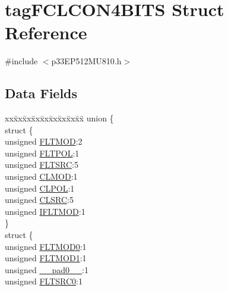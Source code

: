 \hypertarget{structtag_f_c_l_c_o_n4_b_i_t_s}{}\section{tag\+F\+C\+L\+C\+O\+N4\+B\+I\+TS Struct Reference}
\label{structtag_f_c_l_c_o_n4_b_i_t_s}


{\ttfamily \#include $<$p33\+E\+P512\+M\+U810.\+h$>$}

\subsection*{Data Fields}
\begin{DoxyCompactItemize}
\item 
\begin{tabbing}
xx\=xx\=xx\=xx\=xx\=xx\=xx\=xx\=xx\=\kill
union \{\\
\>struct \{\\
\>\>unsigned \hyperlink{structtag_f_c_l_c_o_n4_b_i_t_s_af8b7a5d667b31f1b0185c35ff963fc67}{FLTMOD}:2\\
\>\>unsigned \hyperlink{structtag_f_c_l_c_o_n4_b_i_t_s_acc9b95c2c3d735179abf0bb2304d00aa}{FLTPOL}:1\\
\>\>unsigned \hyperlink{structtag_f_c_l_c_o_n4_b_i_t_s_a5a279b9076b9774eeddf447ae606182a}{FLTSRC}:5\\
\>\>unsigned \hyperlink{structtag_f_c_l_c_o_n4_b_i_t_s_a9e490f0d4e5c9492ed27b0835fd4baa1}{CLMOD}:1\\
\>\>unsigned \hyperlink{structtag_f_c_l_c_o_n4_b_i_t_s_aa4163df728ce542fa3662a31fed0dab0}{CLPOL}:1\\
\>\>unsigned \hyperlink{structtag_f_c_l_c_o_n4_b_i_t_s_a55ab508cbc7a5023f1962f743a92a56b}{CLSRC}:5\\
\>\>unsigned \hyperlink{structtag_f_c_l_c_o_n4_b_i_t_s_a4573eed251d96a98a6b5ba1c7cc30451}{IFLTMOD}:1\\
\>\} \\
\>struct \{\\
\>\>unsigned \hyperlink{structtag_f_c_l_c_o_n4_b_i_t_s_acd6a08a1920b6cc12c170cbd6a61247d}{FLTMOD0}:1\\
\>\>unsigned \hyperlink{structtag_f_c_l_c_o_n4_b_i_t_s_accd970bed6a20d6ed7d5a8bb0a9329a3}{FLTMOD1}:1\\
\>\>unsigned \hyperlink{structtag_f_c_l_c_o_n4_b_i_t_s_adf71f3d8410c1f1dbbc96680a92c49af}{\_\_pad0\_\_}:1\\
\>\>unsigned \hyperlink{structtag_f_c_l_c_o_n4_b_i_t_s_ab130e70dc1cfc857cc586e187458c5ea}{FLTSRC0}:1\\

\end{tabbing}
\end{DoxyCompactItemize}
